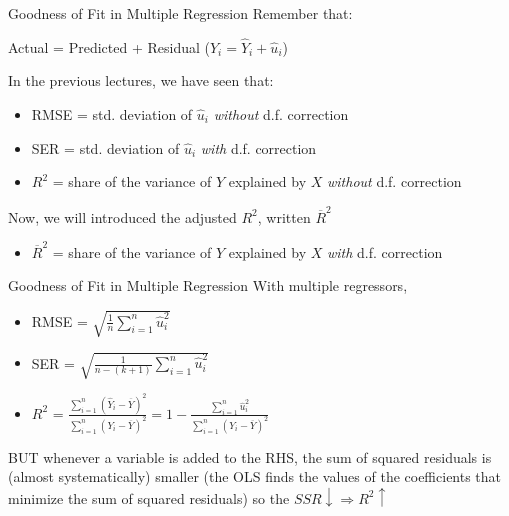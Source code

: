 \documentclass[notes,10pt, aspectratio=169]{beamer}
\begin{document}
\begin{frame}{Goodness of Fit in Multiple Regression}
Remember that:
\begin{center}
    Actual = Predicted + Residual ($Y_i= \hat{Y}_i+\hat{u}_i$)
\end{center}
In the previous lectures, we have seen that:

\begin{itemize}
    \item RMSE = std. deviation of $\hat{u}_i$ \textit{without} d.f. correction
    \item SER = std. deviation of $\hat{u}_i$ \textit{with} d.f. correction
    \item $R^2$ = share of the variance of $Y$ explained by $X$ \textit{without} d.f. correction
\end{itemize}
Now, we will introduced the adjusted $R^2$, written $\overline{R}^2$
\begin{itemize}
    \item[$\Rightarrow$] $\overline{R}^2$ = share of the variance of $Y$ explained by $X$ \textit{with} d.f. correction
\end{itemize}
\end{frame}

\begin{frame}{Goodness of Fit in Multiple Regression}
With multiple regressors,
\begin{itemize}
    \item RMSE = $\sqrt{\frac{1}{n}\sum_{i=1}^n \hat{u}_i^2}$
    \item SER = $\sqrt{\frac{1}{n-(k+1)}\sum_{i=1}^n \hat{u}_i^2}$
    \item $R^2$ = $\frac{\sum_{i=1}^n(\hat{Y}_i-\overline{{Y}})^2}{\sum_{i=1}^n({Y}_i-\overline{Y})^2}= 1-\frac{\sum_{i=1}^n \hat{u}_i^2}{\sum_{i=1}^n({Y}_i-\overline{Y})^2}$
\end{itemize}
\vspace{1cm}
BUT whenever a variable is added to the RHS, the sum of squared residuals is (almost systematically) smaller (the OLS finds the values of the coefficients that minimize
the sum of squared residuals) so the $SSR \downarrow\Rightarrow R^2 \uparrow$
\end{frame}
\end{document}
